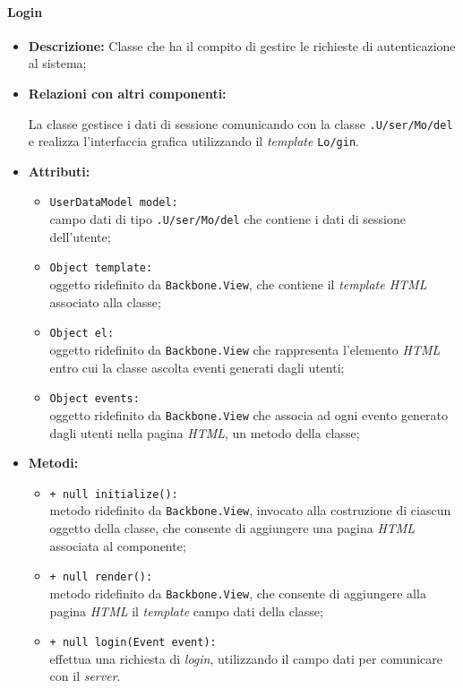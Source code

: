 \paragraph{Login}
\label{login}
\begin{flushleft}
\begin{itemize}
\item \textbf{Descrizione:} Classe che ha il compito di gestire le richieste di autenticazione al sistema;
\item \textbf{Relazioni con altri componenti:}
\begin{sloppypar}
La classe gestisce i dati di sessione comunicando con la classe \texttt{\model{}.U\fshyp{}ser\fshyp{}Mo\fshyp{}del} e realizza l'interfaccia grafica utilizzando il \textit{template} \texttt{\view{}Lo\fshyp{}gin}.
\end{sloppypar}
\item \textbf{Attributi:}
\begin{sloppypar}
\begin{itemize}
\item \texttt{UserDataModel model:}\\ campo dati di tipo \texttt{\model{}.U\fshyp{}ser\fshyp{}Mo\fshyp{}del} che contiene i dati di sessione dell'utente;
\item \texttt{Object template:}\\ oggetto ridefinito da \texttt{Backbone.View}, che contiene il \textit{template HTML} associato alla classe;
\item \texttt{Object el:}\\ oggetto ridefinito da \texttt{Backbone.View} che rappresenta l'elemento \textit{HTML} entro cui la classe ascolta eventi generati dagli utenti;
\item \texttt{Object events:}\\ oggetto ridefinito da \texttt{Backbone.View} che associa ad ogni evento generato dagli utenti nella pagina \textit{HTML}, un metodo della classe;
\end{itemize}
\end{sloppypar}
\item \textbf{Metodi:}
\begin{sloppypar}
\begin{itemize}
\item \texttt{+ null initialize():}\\ metodo ridefinito da \texttt{Backbone.View}, invocato alla costruzione di ciascun oggetto della classe, che consente di aggiungere una pagina \textit{HTML} associata al componente;
\item \texttt{+ null render():}\\ metodo ridefinito da \texttt{Backbone.View}, che consente di aggiungere alla pagina \textit{HTML} il \textit{template} campo dati della classe;
\item \texttt{+ null login(Event event):}\\ effettua una richiesta di \textit{login}, utilizzando il campo dati \model{} per comunicare con il \textit{server}.
\end{itemize}
\end{sloppypar}
\end{itemize}
\end{flushleft}

